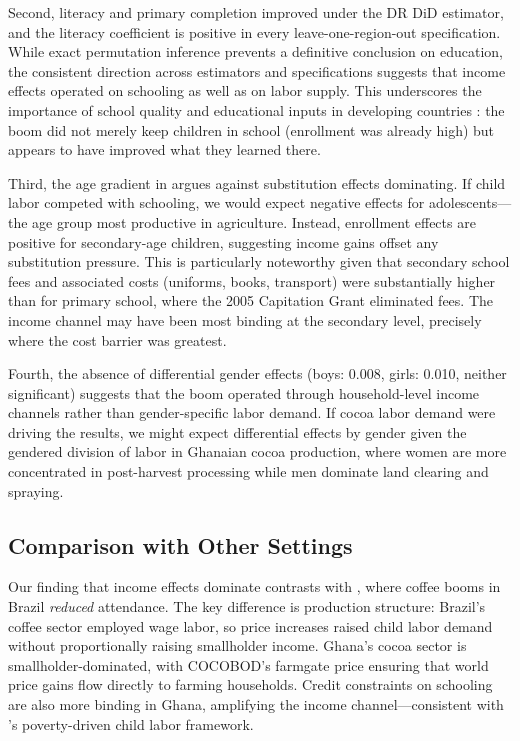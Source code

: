 \documentclass[12pt]{article}
\begin{document}
Second, literacy and primary completion improved under the DR DiD estimator, and the literacy coefficient is positive in every leave-one-region-out specification. While exact permutation inference prevents a definitive conclusion on education, the consistent direction across estimators and specifications suggests that income effects operated on schooling as well as on labor supply. This underscores the importance of school quality and educational inputs in developing countries \citep{glewwe2002}: the boom did not merely keep children in school (enrollment was already high) but appears to have improved what they learned there.

Third, the age gradient in  argues against substitution effects dominating. If child labor competed with schooling, we would expect negative effects for adolescents---the age group most productive in agriculture. Instead, enrollment effects are positive for secondary-age children, suggesting income gains offset any substitution pressure. This is particularly noteworthy given that secondary school fees and associated costs (uniforms, books, transport) were substantially higher than for primary school, where the 2005 Capitation Grant eliminated fees. The income channel may have been most binding at the secondary level, precisely where the cost barrier was greatest.

Fourth, the absence of differential gender effects (boys: 0.008, girls: 0.010, neither significant) suggests that the boom operated through household-level income channels rather than gender-specific labor demand. If cocoa labor demand were driving the results, we might expect differential effects by gender given the gendered division of labor in Ghanaian cocoa production, where women are more concentrated in post-harvest processing while men dominate land clearing and spraying.

\subsection{Comparison with Other Settings}

Our finding that income effects dominate contrasts with \citet{kruger2007}, where coffee booms in Brazil \textit{reduced} attendance. The key difference is production structure: Brazil's coffee sector employed wage labor, so price increases raised child labor demand without proportionally raising smallholder income. Ghana's cocoa sector is smallholder-dominated, with COCOBOD's farmgate price ensuring that world price gains flow directly to farming households. Credit constraints on schooling are also more binding in Ghana, amplifying the income channel---consistent with \citet{basu1998}'s poverty-driven child labor framework.
\end{document}
